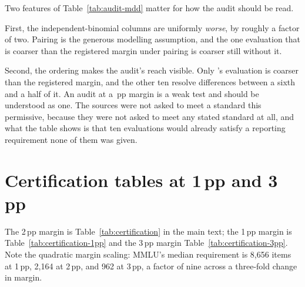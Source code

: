 Two features of Table~\ref{tab:audit-mdd} matter for how the audit should be
read.

First, the independent-binomial columns are uniformly \emph{worse}, by roughly a
factor of two. Pairing is the generous modelling assumption, and the one
evaluation that is coarser than the registered margin under pairing is coarser
still without it.

Second, the ordering makes the audit's reach visible. Only
\AuditSensitiveClaim{}'s evaluation is coarser than the registered margin, and
the other ten resolve differences between a sixth and a half of it. An audit at a
\AuditMarginPP{}\,pp margin is a weak test and should be understood as one. The
sources were not asked to meet a standard this permissive, because they were not
asked to meet any stated standard at all, and what the table shows is that ten
evaluations would already satisfy a reporting requirement none of them was given.


\section{Certification tables at 1\,pp and 3\,pp}
\label{app:certification-margins}

The 2\,pp margin is Table~\ref{tab:certification} in the main text; the
1\,pp margin is Table~\ref{tab:certification-1pp} and the 3\,pp margin
Table~\ref{tab:certification-3pp}. Note the quadratic margin scaling: MMLU's median
requirement is 8{,}656 items at 1\,pp, 2{,}164 at 2\,pp, and 962 at 3\,pp, a
factor of nine across a three-fold change in margin.

